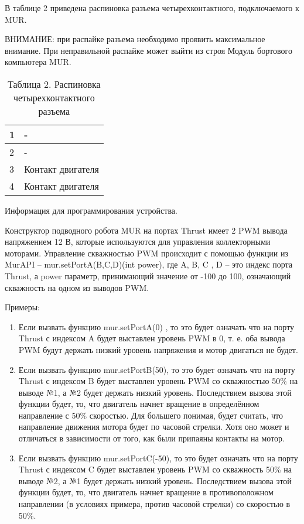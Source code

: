 В таблице 2 приведена распиновка разъема четырехконтактного, подключаемого к MUR. 

ВНИМАНИЕ: при распайке разъема необходимо проявить максимальное внимание. При неправильной распайке может выйти из строя Модуль бортового компьютера MUR.

\begin{table}[H]
    \center
    \caption{Таблица 2. Распиновка четырехконтактного разъема}
    \begin{tabular}{|l|l|}
        \hline
        1 & - \\
        \hline
        2 & - \\
        \hline
        3 & Контакт двигателя \\
        \hline
        4 & Контакт двигателя \\
        \hline
    \end{tabular}
\end{table}

Информация для программирования устройства.

Конструктор подводного робота MUR на портах Thrust имеет 2 PWM вывода напряжением 12 В, которые используются для управления коллекторными моторами. Управление скважностью PWM происходит с помощью функции из MurAPI – mur.setPortA(B,C,D)(int power), где A, B, C , D – это индекс порта Thrust, а power параметр, принимающий значение от -100 до 100, означающий скважность на одном из выводов PWM.

Примеры:
\begin{enumerate}
    \item Если вызвать функцию mur.setPortA(0) , то это будет означать что на порту Thrust с индексом A будет выставлен уровень PWM в 0, т. е. оба вывода PWM будут держать низкий уровень напряжения и мотор двигаться не будет.
    \item Если вызвать функцию mur.setPortB(50), то это будет означать что на порту Thrust с индексом B будет выставлен уровень PWM со скважностью 50\% на выводе №1, а №2 будет держать низкий уровень. Последствием вызова этой функции будет, то, что двигатель начнет вращение в определённом направление с 50\% скоростью. Для большего понимая, будет считать, что направление движения мотора будет по часовой стрелки. Хотя оно может и отличаться в зависимости от того, как были припаяны контакты на мотор.
    \item Если вызвать функцию mur.setPortC(-50), то это будет означать что на порту Thrust с индексом C будет выставлен уровень PWM со скважность 50\% на выводе №2,  а №1 будет держать низкий уровень. Последствием вызова этой функции будет, то, что двигатель начнет вращение в противоположном направлении (в условиях примера, против часовой стрелки) со скоростью в 50\%.
\end{enumerate}

